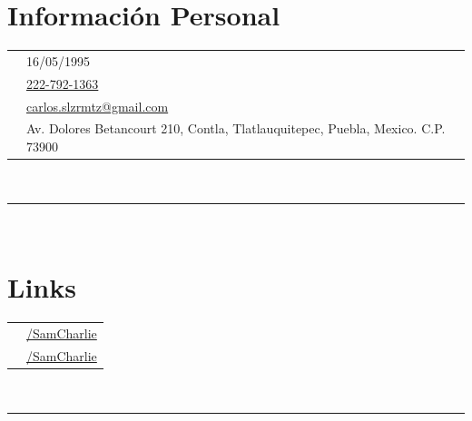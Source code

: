 \documentclass[oneside]{article}
\begin{document}
{\begin{minipage}[t][\textheight-2\fboxsep-2\fboxrule][t]{\dimexpr0.40\textwidth-2\fboxrule-2\fboxsep\relax}
        \section*{\large Información Personal}
        \begin{tabularx}{\textwidth}{cY}
            \faStarOfLife{} & 16/05/1995 \\
            \faPhone{}      & \href{tel:222-792-1363}{222-792-1363} \\
            \faEnvelope{}   & \href{mailto:carlos.slzrmtz@gmail.com}{carlos.slzrmtz@gmail.com} \\
            \faMapMarker{}  & Av. Dolores Betancourt 210, Contla, Tlatlauquitepec, Puebla, Mexico. C.P. 73900 \\
        \end{tabularx}
        \vspace{.3cm} \\
        \rule{\linewidth}{0.4pt} \\
        \section*{\large Links}
        \begin{tabular}{cl}
            \faLinkedin{} & \href{https://www.linkedin.com/in/samcharlie/}{/SamCharlie} \\
            \faGithub{}   & \href{https://github.com/SamCharlie}{/SamCharlie} \\
        \end{tabular}
        \vspace{10pt} \\
        \rule{\linewidth}{0.4pt} \\

\end{minipage}}
\end{document}
